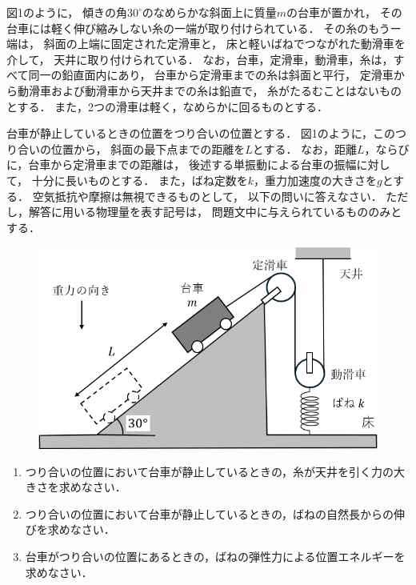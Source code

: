 \setcounter{figure}{0}
図1のように，
傾きの角$30^\circ$のなめらかな斜面上に質量$m$の台車が置かれ，
その台車には軽く伸び縮みしない糸の一端が取り付けられている．
その糸のもうー端は，
斜面の上端に固定された定滑車と，
床と軽いばねでつながれた動滑車を介して，
天井に取り付けられている．
なお，台車，定滑車，動滑車，糸は，すべて同一の鉛直面内にあり，
台車から定滑車までの糸は斜面と平行，
定滑車から動滑車および動滑車から天井までの糸は鉛直で，
糸がたるむことはないものとする．
また，2つの滑車は軽く，なめらかに回るものとする．



台車が静止しているときの位置をつり合いの位置とする．
図1のように，このつり合いの位置から，
斜面の最下点までの距離を$L$とする．
なお，距離$L$，ならびに，台車から定滑車までの距離は，
後述する単振動による台車の振幅に対して，
十分に長いものとする．
また，ばね定数を$k$，重力加速度の大きさを$g$とする．
空気抵抗や摩擦は無視できるものとして，
以下の問いに答えなさい．
ただし，解答に用いる物理量を表す記号は，
問題文中に与えられているもののみとする．


\begin{figure}[H]
  \centering
  \includegraphics[width=.6\columnwidth]{../graphs/chiba_23_1.png}
  \caption{}
\end{figure}

\begin{enumerate}[（1）]
  \setlength{\leftskip}{-1zw}
  \setlength{\itemindent}{1zw}\setlength{\labelsep}{0.5zw}
  \setlength{\labelwidth}{1zw}\setlength{\leftmargin}{1zw}
  \setlength{\itemsep}{0.5\baselineskip}
  \item つり合いの位置において台車が静止しているときの，糸が天井を引く力の大きさを求めなさい．
  \item つり合いの位置において台車が静止しているときの，ばねの自然長からの伸びを求めなさい．
  \item 台車がつり合いの位置にあるときの，ばねの弾性力による位置エネルギーを求めなさい．
\end{enumerate}



